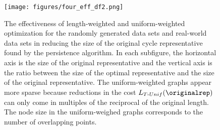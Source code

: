\begin{figure}[h!]
\begin{center}
\texttt{[image: figures/four\_eff\_df2.png]}%
\end{center}
\caption{The effectiveness of length-weighted and uniform-weighted optimization for the randomly generated data sets and real-world data sets in reducing the size of the original cycle representative found by the persistence algorithm. In each subfigure, the horizontal axis is the size of the original representative and the vertical axis is the ratio between the size of the optimal representative and the size of the original representative. The uniform-weighted graphs appear more sparse because reductions in the cost $L_{T\text{-}Unif}(\originalrep)$ can only come in multiples of the reciprocal of the original length. The node size in the uniform-weighed graphs corresponds to the number of overlapping points. %
}\label{fig:effectivenessall}
\end{figure}


